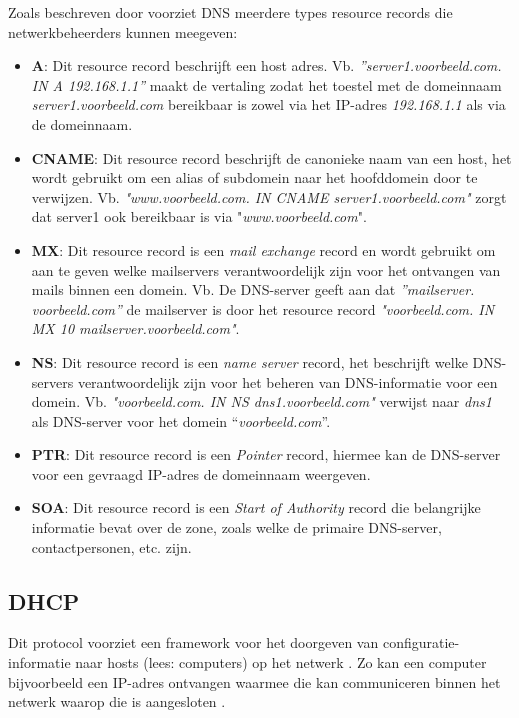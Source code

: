 Zoals beschreven door \textcite{Mockapetris1987} voorziet DNS meerdere types resource records die netwerkbeheerders kunnen meegeven: 
\begin{itemize}
    \item \textbf{A}: Dit resource record beschrijft een host adres. 
    Vb. \textit{”server1.voorbeeld.com. IN A 192.168.1.1”} maakt de vertaling zodat het toestel met de domeinnaam \textit{server1.voorbeeld.com} bereikbaar is zowel via het IP-adres \textit{192.168.1.1} als via de domeinnaam. 
    \item \textbf{CNAME}: Dit resource record beschrijft de canonieke naam van een host, het wordt gebruikt om een alias of subdomein naar het hoofddomein door te verwijzen. Vb. \textit{"www.voorbeeld.com. IN CNAME server1.voorbeeld.com"} zorgt dat server1 ook bereikbaar is via "\textit{www.voorbeeld.com}".
    \item \textbf{MX}: Dit resource record is een \textit{mail exchange} record en wordt gebruikt om aan te geven welke mailservers verantwoordelijk zijn voor het ontvangen van mails binnen een domein. Vb. De DNS-server geeft aan dat \textit{”mailserver.\\voorbeeld.com”} de mailserver is door het resource record \textit{"voorbeeld.com. IN MX 10 mailserver.voorbeeld.com"}.
    \item \textbf{NS}: Dit resource record is een \textit{name server} record, het beschrijft welke DNS-servers verantwoordelijk zijn voor het beheren van DNS-informatie voor een domein. Vb. \textit{"voorbeeld.com. IN NS dns1.voorbeeld.com"} verwijst naar \textit{dns1} als DNS-server voor het domein “\textit{voorbeeld.com}”.
    \item \textbf{PTR}: Dit resource record is een \textit{Pointer} record, hiermee kan de DNS-server voor een gevraagd IP-adres de domeinnaam weergeven.
    \item \textbf{SOA}: Dit resource record is een \textit{Start of Authority} record die belangrijke informatie bevat over de zone, zoals welke de primaire DNS-server, contactpersonen, etc. zijn.
\end{itemize}

\subsection{DHCP}
Dit protocol voorziet een framework voor het doorgeven van configuratie-informatie naar hosts (lees: computers) op het netwerk . Zo kan een computer bijvoorbeeld een IP-adres ontvangen waarmee die kan communiceren binnen het netwerk waarop die is aangesloten \autocite{Droms1997}.


